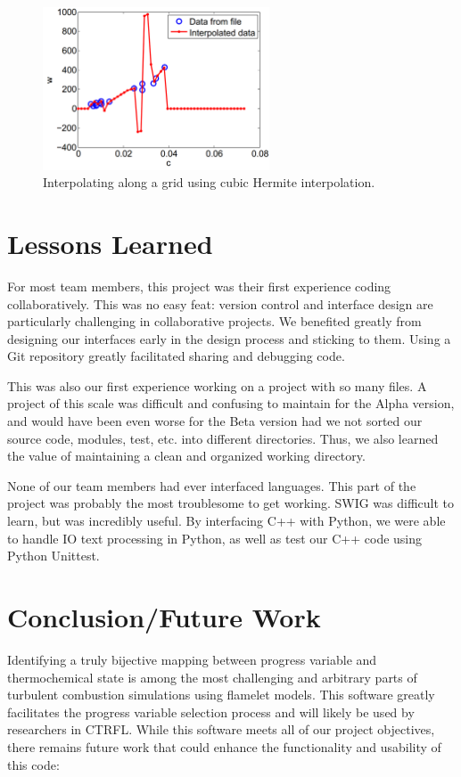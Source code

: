 \documentclass[11pt]{article}
\begin{document}
\begin{figure} [h]
\centering
\includegraphics[width=0.6\textwidth]{interpolator.PNG}
\caption{\label{fig:interpolator} Interpolating along a grid using
  cubic Hermite interpolation.}
\end{figure}


\section{Lessons Learned}
For most team members, this project was their first experience coding
collaboratively. This was no easy feat: version control and interface
design are particularly challenging in collaborative projects. We
benefited greatly from designing our interfaces early in the design
process and sticking to them. Using a Git repository greatly
facilitated sharing and debugging code.

This was also our first experience working on a project with so many
files. A project of this scale was difficult and confusing to maintain
for the Alpha version, and would have been even worse for the Beta
version had we not sorted our source code, modules, test, etc. into
different directories. Thus, we also learned the value of maintaining
a clean and organized working directory.

None of our team members had ever interfaced languages. This part of
the project was probably the most troublesome to get working. SWIG was
difficult to learn, but was incredibly useful. By interfacing C++ with
Python, we were able to handle IO text processing in Python, as well
as test our C++ code using Python Unittest.

\newpage
\section{Conclusion/Future Work}
Identifying a truly bijective mapping between progress variable and
thermochemical state is among the most challenging and arbitrary parts
of turbulent combustion simulations using flamelet models. This
software greatly facilitates the progress variable selection process
and will likely be used by researchers in CTRFL. While this software
meets all of our project objectives, there remains future work that
could enhance the functionality and usability of this code:
\end{document}
